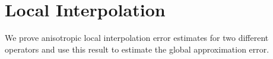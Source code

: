 \chapter{Local Interpolation}
We prove anisotropic local interpolation error estimates for two different operators
and use this result to estimate the global approximation error.



